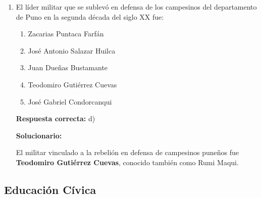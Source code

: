 \begin{enumerate}[resume]
	\vspace{2mm}
	\textbf{Solucionario:}
	
	Durante ese gobierno se creó el \textbf{Centro de Altos Estudios Militares (CAEM)}.
	

	
	\vspace{6mm}
	
	\item El líder militar que se sublevó en defensa de los campesinos del departamento de Puno en la segunda década del siglo XX fue:
	\begin{enumerate}[label=\alph*)]
		\item Zacarias Puntaca Farfán
		\item José Antonio Salazar Huilca
		\item Juan Dueñas Bustamante
		\item Teodomiro Gutiérrez Cuevas
		\item José Gabriel Condorcanqui
	\end{enumerate}
	\textbf{Respuesta correcta:} d)
	
	\vspace{2mm}
	\textbf{Solucionario:}
	
	El militar vinculado a la rebelión en defensa de campesinos puneños fue \textbf{Teodomiro Gutiérrez Cuevas}, conocido también como Rumi Maqui.
	

	
	\vspace{6mm}
\end{enumerate}

\subsection*{Educación Cívica}


